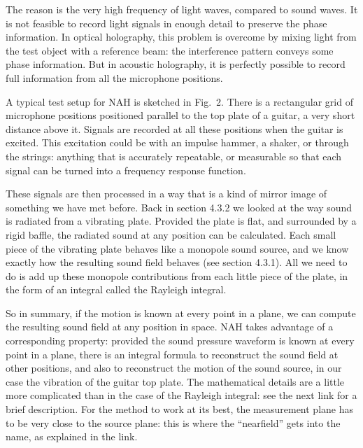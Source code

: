   The reason is the very high frequency of light waves, compared to sound 
  waves. It is not feasible to record light signals in enough detail to 
  preserve the phase information. In optical holography, this problem is 
  overcome by mixing light from the test object with a reference beam: the 
  interference pattern conveys some phase information. But in acoustic 
  holography, it is perfectly possible to record full information from all the 
  microphone positions. 

  A typical test setup for NAH is sketched in Fig.\ 2. There is a rectangular 
  grid of microphone positions positioned parallel to the top plate of a 
  guitar, a very short distance above it. Signals are recorded at all these 
  positions when the guitar is excited. This excitation could be with an 
  impulse hammer, a shaker, or through the strings: anything that is accurately 
  repeatable, or measurable so that each signal can be turned into a frequency 
  response function. 


  These signals are then processed in a way that is a kind of mirror image of 
  something we have met before. Back in section 4.3.2 we looked at the way 
  sound is radiated from a vibrating plate. Provided the plate is flat, and 
  surrounded by a rigid baffle, the radiated sound at any position can be 
  calculated. Each small piece of the vibrating plate behaves like a monopole 
  sound source, and we know exactly how the resulting sound field behaves (see 
  section 4.3.1). All we need to do is add up these monopole contributions from 
  each little piece of the plate, in the form of an integral called the 
  Rayleigh integral. 

  So in summary, if the motion is known at every point in a plane, we can 
  compute the resulting sound field at any position in space. NAH takes 
  advantage of a corresponding property: provided the sound pressure waveform 
  is known at every point in a plane, there is an integral formula to 
  reconstruct the sound field at other positions, and also to reconstruct the 
  motion of the sound source, in our case the vibration of the guitar top 
  plate. The mathematical details are a little more complicated than in the 
  case of the Rayleigh integral: see the next link for a brief description. For 
  the method to work at its best, the measurement plane has to be very close to 
  the source plane: this is where the “nearfield” gets into the name, as 
  explained in the link. 

